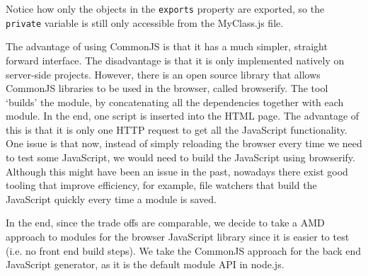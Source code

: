 Notice how only the objects in the \lstinline{exports} property are exported, so the \lstinline{private} variable is still only accessible from the MyClass.js file.

The advantage of using CommonJS is that it has a much simpler, straight forward interface. The disadvantage is that it is only implemented natively on server-side projects. However, there is an open source library that allows CommonJS libraries to be used in the browser, called browserify. The tool `builds' the module, by concatenating all the dependencies together with each module. In the end, one script is inserted into the HTML page. The advantage of this is that it is only one HTTP request to get all the JavaScript functionality. One issue is that now, instead of simply reloading the browser every time we need to test some JavaScript, we would need to build the JavaScript using browserify. Although this might have been an issue in the past, nowadays there exist good tooling that improve efficiency, for example, file watchers that build the JavaScript quickly every time a module is saved.


In the end, since the trade offs are comparable, we decide to take a AMD approach to modules for the browser JavaScript library since it is easier to test (i.e. no front end build steps). We take the CommonJS approach for the back end JavaScript generator, as it is the default module API in node.js.


